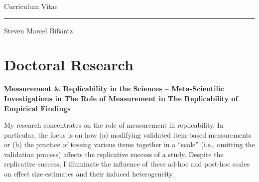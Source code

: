 \documentclass[10pt]{FreemanCV}
\begin{document}
\begin{paracol}{2} %


\parbox[][0.11\textheight][c]{\linewidth}{ 
	\centering %
	
	{\Huge\textcolor{headings}{Curriculum Vitae}} %
	\par\noindent\rule{6cm}{0.4pt}
	\medskip %
	
	{\sffamily\Large{Steven Marcel Bißantz}}
	
	\vfill %
}


\section{Doctoral Research}

{\raggedright\textbf{Measurement \& Replicability in the Sciences --
Meta-Scientific Investigations in The Role of Measurement in The Replicability
of Empirical Findings}\par}

\medskip %

My research concentrates on the role of measurement in replicability. In
particular, the focus is on how (a) modifying validated item-based measurements
or (b) the practice of tossing various items together in a \enquote{scale}
(i.e., omitting the validation process) affects the replicative success of a
study. Despite the replicative success, I illuminate the influence of these
ad-hoc and post-hoc scales on effect size estimates and their induced
heterogeneity.

\medskip %



\end{paracol}
\end{document}
